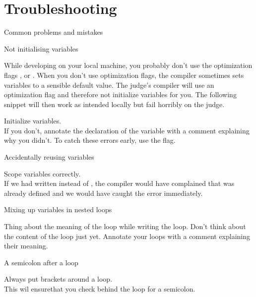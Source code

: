 \documentclass[guide.tex]{subfiles}
\begin{document}
\section{Troubleshooting}
{\large Common problems and mistakes}\\

\begin{mt}{Not initialising variables}

  While developing on your local machine, you probably don't use the optimization flags ,  or .
  When you don't use optimization flags, the compiler sometimes sets variables to a sensible default value.
  The judge's compiler will use an optimization flag and therefore not initialize variables for you.
  The following snippet will then work as intended locally but fail horribly on the judge.


  \begin{fx}
    Initialize variables.\\
    If you don't, annotate the declaration of the variable with a comment explaining why you didn't.
    To catch these errors early, use the  flag.
  \end{fx}
\end{mt}

\begin{mt}{Accidentally reusing variables}
  \begin{fx}
    Scope variables correctly.\\
    If we had written  instead of , the compiler would have complained that  was already defined and we would have caught the error immediately.
  \end{fx}
\end{mt}

\begin{mt}{Mixing up variables in nested loops}
  \begin{fx}
    Thing about the meaning of the loop while writing the loop.
    Don't think about the content of the loop just yet.
    Annotate your loops with a comment explaining their meaning.
  \end{fx}
\end{mt}

\begin{mt}{A semicolon after a loop}
  \begin{fx}
    Always put brackets around a loop.\\
    This wil ensurethat you check behind the loop for a semicolon.
  \end{fx}
\end{mt}
\end{document}
